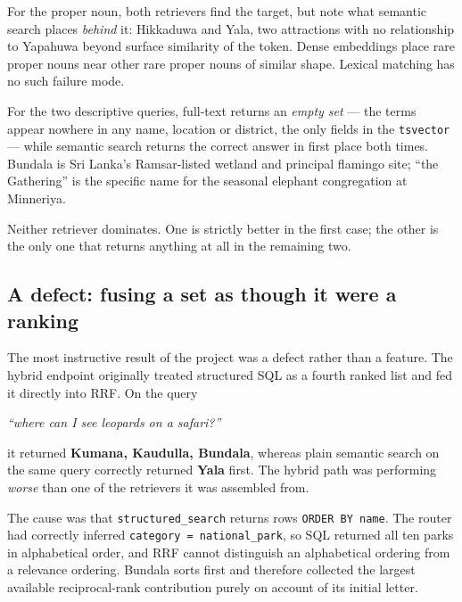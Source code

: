 \documentclass[11pt,a4paper]{article}
\begin{document}
For the proper noun, both retrievers find the target, but note what semantic
search places \emph{behind} it: Hikkaduwa and Yala, two attractions with no
relationship to Yapahuwa beyond surface similarity of the token. Dense
embeddings place rare proper nouns near other rare proper nouns of similar
shape. Lexical matching has no such failure mode.

For the two descriptive queries, full-text returns an \emph{empty set} --- the
terms appear nowhere in any name, location or district, the only fields in the
\texttt{tsvector} --- while semantic search returns the correct answer in first
place both times. Bundala is Sri Lanka's Ramsar-listed wetland and principal
flamingo site; ``the Gathering'' is the specific name for the seasonal elephant
congregation at Minneriya.

Neither retriever dominates. One is strictly better in the first case; the other
is the only one that returns anything at all in the remaining two.

\subsection{A defect: fusing a set as though it were a ranking}
\label{sec:defect}

The most instructive result of the project was a defect rather than a feature.
The hybrid endpoint originally treated structured SQL as a fourth ranked list
and fed it directly into RRF. On the query

\begin{center}\emph{``where can I see leopards on a safari?''}\end{center}

it returned \textbf{Kumana, Kaudulla, Bundala}, whereas plain semantic search on
the same query correctly returned \textbf{Yala} first. The hybrid path was
performing \emph{worse} than one of the retrievers it was assembled from.

The cause was that \texttt{structured\_search} returns rows \texttt{ORDER BY
name}. The router had correctly inferred \texttt{category = national\_park}, so
SQL returned all ten parks in alphabetical order, and RRF cannot distinguish an
alphabetical ordering from a relevance ordering. Bundala sorts first and
therefore collected the largest available reciprocal-rank contribution purely on
account of its initial letter.
\end{document}
